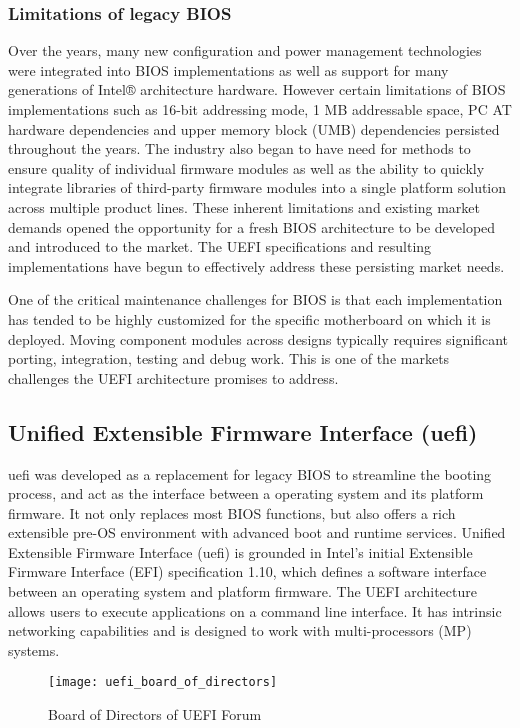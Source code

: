 \subsubsection{Limitations of legacy BIOS}
Over the years, many new configuration and power management technologies were integrated
into BIOS implementations as well as support for many generations of Intel® architecture
hardware. However certain limitations of BIOS implementations such as 16-bit addressing mode,
1 MB addressable space, PC AT hardware dependencies and upper memory block (UMB)
dependencies persisted throughout the years. The industry also began to have need for methods to
ensure quality of individual firmware modules as well as the ability to quickly integrate libraries
of third-party firmware modules into a single platform solution across multiple product lines.
These inherent limitations and existing market demands opened the opportunity for a fresh BIOS
architecture to be developed and introduced to the market. The UEFI specifications and resulting
implementations have begun to effectively address these persisting market needs.

One of the critical maintenance challenges for BIOS is that each implementation has tended to
be highly customized for the specific motherboard on which it is deployed. Moving component
modules across designs typically requires significant porting, integration, testing and debug work.
This is one of the markets challenges the UEFI architecture promises to address.

\subsection{Unified Extensible Firmware Interface (\gls{uefi})}
\gls{uefi} was developed as a replacement for legacy BIOS to streamline the booting process, and act as the interface between a operating system and its platform firmware. It not only replaces most BIOS functions, but also offers a rich extensible pre-OS environment with advanced boot and runtime services.
Unified Extensible Firmware Interface (\gls{uefi}) is grounded in Intel's initial Extensible Firmware Interface (EFI) specification 1.10, which defines a software interface between an operating system and platform firmware. The UEFI architecture allows users to execute applications on a command line interface. It has intrinsic networking capabilities and is designed to work with multi-processors (MP) systems.

\begin{figure}[h]
	\texttt{[image: uefi\_board\_of\_directors]}
	\caption{Board of Directors of UEFI Forum}\label{fig:introduction-uefi-board-of-directors}
\end{figure}

